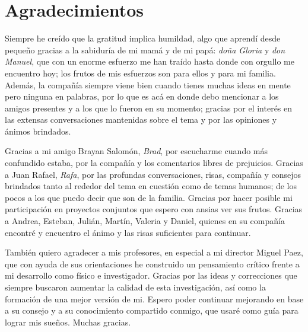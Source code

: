 \chapter*{Agradecimientos}

Siempre he creído que la gratitud implica humildad, algo que aprendí desde pequeño gracias a la sabiduría de mi mamá y de mi papá: \textit{doña Gloria} y \textit{don Manuel}, que con un enorme esfuerzo me han traído hasta donde con orgullo me encuentro hoy; los frutos de mis esfuerzos son para ellos y para mi familia. Además, la compañía siempre viene bien cuando tienes muchas ideas en mente pero ninguna en palabras, por lo que es acá en donde debo mencionar a los amigos presentes y a los que lo fueron en su momento; gracias por el interés en las extensas conversaciones mantenidas sobre el tema y por las opiniones y ánimos brindados. 

Gracias a mi amigo Brayan Salomón, \textit{Brad}, por escucharme cuando más confundido estaba, por la compañía y los comentarios libres de prejuicios. Gracias a Juan Rafael, \textit{Rafa}, por las profundas conversaciones, risas, compañía y consejos brindados tanto al rededor del tema en cuestión como de temas humanos; de los pocos a los que puedo decir que son de la familia. Gracias por hacer posible mi participación en proyectos conjuntos que espero con ansias ver sus frutos. Gracias a Andrea, Esteban, Julián, Martín, Valeria y Daniel, quienes en su compañía encontré y encuentro el ánimo y las risas suficientes para continuar.

También quiero agradecer a mis profesores, en especial a mi director Miguel Paez, que con ayuda de sus orientaciones he construido un pensamiento crítico frente a mi desarrollo como físico e investigador. Gracias por las ideas y correcciones que siempre buscaron aumentar la calidad de esta investigación, así como la formación de una mejor versión de mi. Espero poder continuar mejorando en base a su consejo y a su conocimiento compartido conmigo, que usaré como guía para lograr mis sueños. Muchas gracias.



